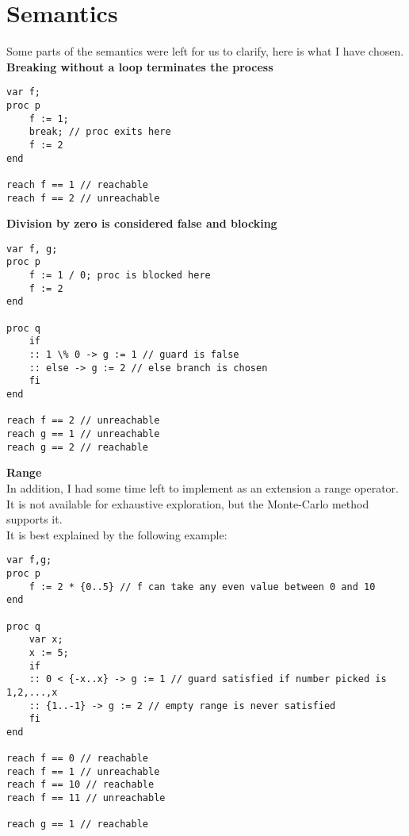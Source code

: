 \section{Semantics}

Some parts of the semantics were left for us to clarify, here is what I have chosen.\\

\textbf{Breaking without a loop terminates the process}
\begin{lstlisting}
var f;
proc p
    f := 1;
    break; // proc exits here
    f := 2
end

reach f == 1 // reachable
reach f == 2 // unreachable
\end{lstlisting}


\textbf{Division by zero is considered false and blocking}
\begin{lstlisting}
var f, g;
proc p
    f := 1 / 0; proc is blocked here
    f := 2
end

proc q
    if
    :: 1 \% 0 -> g := 1 // guard is false
    :: else -> g := 2 // else branch is chosen
    fi
end

reach f == 2 // unreachable
reach g == 1 // unreachable
reach g == 2 // reachable
\end{lstlisting}

\textbf{Range}\\
In addition, I had some time left to implement as an extension
a range operator. It is not available for exhaustive exploration,
but the Monte-Carlo method supports it.\\
It is best explained by the following example:
\begin{lstlisting}
var f,g;
proc p
    f := 2 * {0..5} // f can take any even value between 0 and 10
end

proc q
    var x;
    x := 5;
    if
    :: 0 < {-x..x} -> g := 1 // guard satisfied if number picked is 1,2,...,x
    :: {1..-1} -> g := 2 // empty range is never satisfied
    fi
end

reach f == 0 // reachable
reach f == 1 // unreachable
reach f == 10 // reachable
reach f == 11 // unreachable

reach g == 1 // reachable
\end{lstlisting}

